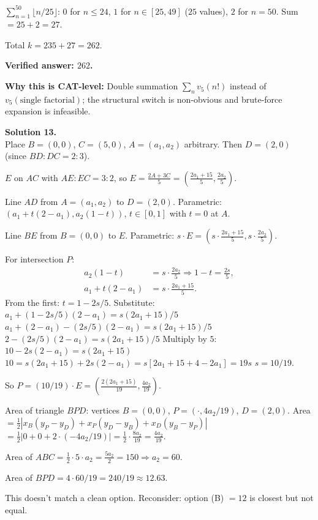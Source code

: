 \documentclass[11pt,a4paper]{article}
\newcommand{\shead}[1]{\vspace{0.5em}\noindent\textbf{Solution #1.}\\[0.15em]}
\begin{document}
$\sum_{n=1}^{50} \lfloor n/25 \rfloor$: $0$ for $n \le 24$, $1$ for $n \in [25, 49]$ ($25$ values), $2$ for $n = 50$. Sum $= 25 + 2 = 27$.

Total $k = 235 + 27 = 262$.

\textbf{Verified answer: $262$.}

\textbf{Why this is CAT-level:} Double summation $\sum_n v_5(n!)$ instead of $v_5(\text{single factorial})$; the structural switch is non-obvious and brute-force expansion is infeasible.

\shead{13}
Place $B = (0,0)$, $C = (5, 0)$, $A = (a_1, a_2)$ arbitrary. Then $D = (2, 0)$ (since $BD:DC = 2:3$).

$E$ on $AC$ with $AE:EC = 3:2$, so $E = \tfrac{2A + 3C}{5} = \left(\tfrac{2a_1 + 15}{5}, \tfrac{2a_2}{5}\right)$.

Line $AD$ from $A = (a_1, a_2)$ to $D = (2, 0)$. Parametric: $(a_1 + t(2 - a_1), a_2(1 - t))$, $t \in [0,1]$ with $t=0$ at $A$.

Line $BE$ from $B = (0,0)$ to $E$. Parametric: $s \cdot E = \left(s \cdot \tfrac{2a_1 + 15}{5}, s \cdot \tfrac{2a_2}{5}\right)$.

For intersection $P$:
\begin{align*}
a_2(1 - t) &= s \cdot \tfrac{2a_2}{5} \Rightarrow 1 - t = \tfrac{2s}{5}, \\
a_1 + t(2 - a_1) &= s \cdot \tfrac{2a_1 + 15}{5}.
\end{align*}
From the first: $t = 1 - 2s/5$. Substitute:
$a_1 + (1 - 2s/5)(2 - a_1) = s(2a_1 + 15)/5$
$a_1 + (2 - a_1) - (2s/5)(2 - a_1) = s(2a_1 + 15)/5$
$2 - (2s/5)(2 - a_1) = s(2a_1 + 15)/5$
Multiply by $5$: $10 - 2s(2 - a_1) = s(2a_1 + 15)$
$10 = s(2a_1 + 15) + 2s(2 - a_1) = s[2a_1 + 15 + 4 - 2a_1] = 19s$
$s = 10/19$.

So $P = (10/19) \cdot E = \left(\tfrac{2(2a_1 + 15)}{19}, \tfrac{4a_2}{19}\right)$.

Area of triangle $BPD$: vertices $B = (0,0)$, $P = (\cdot, 4a_2/19)$, $D = (2, 0)$.
Area $= \tfrac{1}{2} |x_B(y_P - y_D) + x_P(y_D - y_B) + x_D(y_B - y_P)|$
$= \tfrac{1}{2}|0 + 0 + 2 \cdot (-4a_2/19)| = \tfrac{1}{2} \cdot \tfrac{8 a_2}{19} = \tfrac{4 a_2}{19}$.

Area of $ABC = \tfrac{1}{2} \cdot 5 \cdot a_2 = \tfrac{5 a_2}{2} = 150 \Rightarrow a_2 = 60$.

Area of $BPD = 4 \cdot 60 / 19 = 240/19 \approx 12.63$.

This doesn't match a clean option. Reconsider: option (B) $= 12$ is closest but not equal.
\end{document}
